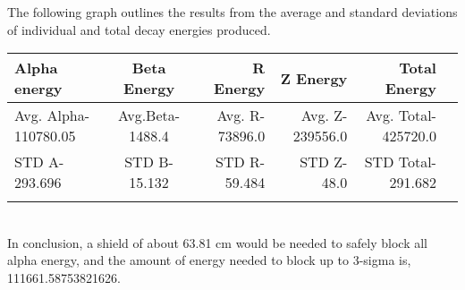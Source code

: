 \documentclass[12pt]{article}
\begin{document}
The following graph outlines the results from the average and standard deviations of individual and total decay energies produced.  %








\begin{center}
\begin{tabular}{|l|crrrr|}\hline\hline
Alpha energy & Beta Energy & R Energy & Z Energy & Total Energy &\\\hline\hline
Avg. Alpha- 110780.05   & Avg.Beta- 1488.4  &  Avg. R- 73896.0 & Avg. Z- 239556.0 & Avg. Total- 425720.0 &  \\
  STD A- 293.696 & STD B- 15.132  &  STD R- 59.484 & STD Z- 48.0 & STD Total- 291.682 &   \\
 \\\hline
\end{tabular}\vskip 0.2in
\end{center}


\vskip0.1in
\\

In conclusion, a shield of about 63.81 cm would be needed to safely block all alpha energy, and the amount of energy needed to block up to 3-sigma is, 111661.58753821626.


\end{document}
